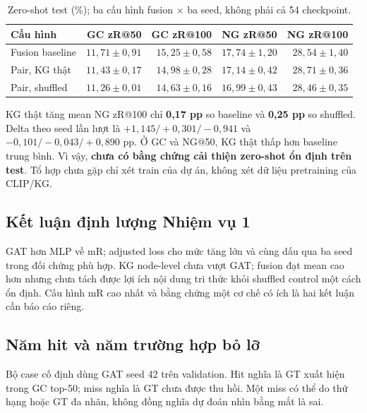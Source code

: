 \begin{table}[H]\centering\small
\caption{Zero-shot test (\%); ba cấu hình fusion $\times$ ba seed, không phải cả 54 checkpoint.}\label{tab:zero}
\begin{tabular}{@{}lrrrr@{}}\toprule
Cấu hình & GC zR@50 & GC zR@100 & NG zR@50 & NG zR@100\\\midrule
Fusion baseline & $11,71\pm0,91$ & $15,25\pm0,58$ & $17,74\pm1,20$ & $28,54\pm1,40$\\
Pair, KG thật & $11,43\pm0,17$ & $14,98\pm0,28$ & $17,14\pm0,42$ & $28,71\pm0,36$\\
Pair, shuffled & $11,26\pm0,01$ & $14,63\pm0,16$ & $16,99\pm0,43$ & $28,46\pm0,35$\\
\bottomrule\end{tabular}\end{table}

KG thật tăng mean NG zR@100 chỉ \textbf{0,17 pp} so baseline và
\textbf{0,25 pp} so shuffled. Delta theo seed lần lượt là
$+1,145/+0,301/-0,941$ và $-0,101/-0,043/+0,890$ pp.
Ở GC và NG@50, KG thật thấp hơn baseline trung bình.
Vì vậy, \textbf{chưa có bằng chứng cải thiện zero-shot ổn định trên test}.
Tổ hợp chưa gặp chỉ xét train của dự án, không xét dữ liệu pretraining của CLIP/KG.

\subsection{Kết luận định lượng Nhiệm vụ 1}
GAT hơn MLP về mR; adjusted loss cho mức tăng lớn và cùng dấu qua ba seed
trong đối chứng phù hợp. KG node-level chưa vượt GAT; fusion đạt mean cao hơn
nhưng chưa tách được lợi ích nội dung tri thức khỏi shuffled control một cách
ổn định. Cấu hình mR cao nhất và bằng chứng một cơ chế có ích là hai
kết luận cần báo cáo riêng.

\clearpage
\subsection{Năm hit và năm trường hợp bỏ lỡ}
Bộ case cố định dùng GAT seed 42 trên validation. Hit nghĩa là GT xuất hiện
trong GC top-50; miss nghĩa là GT chưa được thu hồi. Một miss có thể do thứ
hạng hoặc GT đa nhãn, không đồng nghĩa dự đoán nhìn bằng mắt là sai.

